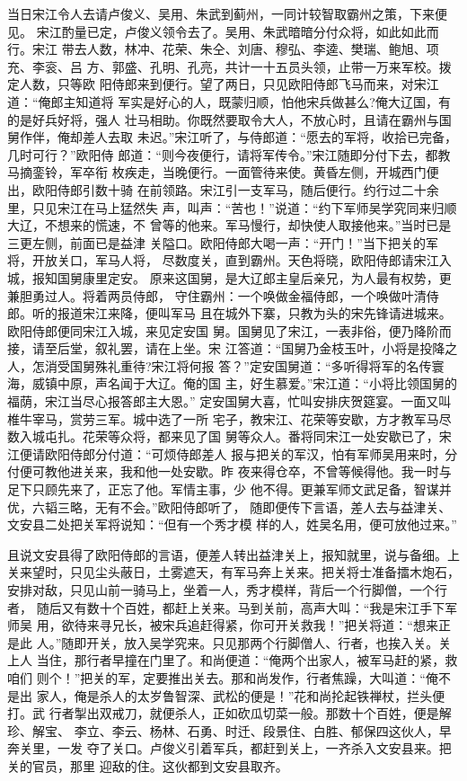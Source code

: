 当日宋江令人去请卢俊义、吴用、朱武到蓟州，一同计较智取霸州之策，下来便见。
宋江酌量已定，卢俊义领令去了。吴用、朱武暗暗分付众将，如此如此而行。宋江
带去人数，林冲、花荣、朱仝、刘唐、穆弘、李逵、樊瑞、鲍旭、项充、李衮、吕
方、郭盛、孔明、孔亮，共计一十五员头领，止带一万来军校。拨定人数，只等欧
阳侍郎来到便行。望了两日，只见欧阳侍郎飞马而来，对宋江道：“俺郎主知道将
军实是好心的人，既蒙归顺，怕他宋兵做甚么?俺大辽国，有的是好兵好将，强人
壮马相助。你既然要取令大人，不放心时，且请在霸州与国舅作伴，俺却差人去取
未迟。”宋江听了，与侍郎道：“愿去的军将，收拾已完备，几时可行？”欧阳侍
郎道：“则今夜便行，请将军传令。”宋江随即分付下去，都教马摘銮铃，军卒衔
枚疾走，当晚便行。一面管待来使。黄昏左侧，开城西门便出，欧阳侍郎引数十骑
在前领路。宋江引一支军马，随后便行。约行过二十余里，只见宋江在马上猛然失
声，叫声：“苦也！”说道：“约下军师吴学究同来归顺大辽，不想来的慌速，不
曾等的他来。军马慢行，却快使人取接他来。”当时已是三更左侧，前面已是益津
关隘口。欧阳侍郎大喝一声：“开门！”当下把关的军将，开放关口，军马人将，
尽数度关，直到霸州。天色将晓，欧阳侍郎请宋江入城，报知国舅康里定安。
原来这国舅，是大辽郎主皇后亲兄，为人最有权势，更兼胆勇过人。将着两员侍郎，
守住霸州：一个唤做金福侍郎，一个唤做叶清侍郎。听的报道宋江来降，便叫军马
且在城外下寨，只教为头的宋先锋请进城来。欧阳侍郎便同宋江入城，来见定安国
舅。国舅见了宋江，一表非俗，便乃降阶而接，请至后堂，叙礼罢，请在上坐。宋
江答道：“国舅乃金枝玉叶，小将是投降之人，怎消受国舅殊礼重待?宋江将何报
答？”定安国舅道：“多听得将军的名传寰海，威镇中原，声名闻于大辽。俺的国
主，好生慕爱。”宋江道：“小将比领国舅的福荫，宋江当尽心报答郎主大恩。”
定安国舅大喜，忙叫安排庆贺筵宴。一面又叫椎牛宰马，赏劳三军。城中选了一所
宅子，教宋江、花荣等安歇，方才教军马尽数入城屯扎。花荣等众将，都来见了国
舅等众人。番将同宋江一处安歇已了，宋江便请欧阳侍郎分付道：“可烦侍郎差人
报与把关的军汉，怕有军师吴用来时，分付便可教他进关来，我和他一处安歇。昨
夜来得仓卒，不曾等候得他。我一时与足下只顾先来了，正忘了他。军情主事，少
他不得。更兼军师文武足备，智谋并优，六韬三略，无有不会。”欧阳侍郎听了，
随即便传下言语，差人去与益津关、文安县二处把关军将说知：“但有一个秀才模
样的人，姓吴名用，便可放他过来。”

且说文安县得了欧阳侍郎的言语，便差人转出益津关上，报知就里，说与备细。上
关来望时，只见尘头蔽日，土雾遮天，有军马奔上关来。把关将士准备擂木炮石，
安排对敌，只见山前一骑马上，坐着一人，秀才模样，背后一个行脚僧，一个行者，
随后又有数十个百姓，都赶上关来。马到关前，高声大叫：“我是宋江手下军师吴
用，欲待来寻兄长，被宋兵追赶得紧，你可开关救我！”把关将道：“想来正是此
人。”随即开关，放入吴学究来。只见那两个行脚僧人、行者，也挨入关。关上人
当住，那行者早撞在门里了。和尚便道：“俺两个出家人，被军马赶的紧，救咱们
则个！”把关的军，定要推出关去。那和尚发作，行者焦躁，大叫道：“俺不是出
家人，俺是杀人的太岁鲁智深、武松的便是！”花和尚抡起铁禅杖，拦头便打。武
行者掣出双戒刀，就便杀人，正如砍瓜切菜一般。那数十个百姓，便是解珍、解宝、
李立、李云、杨林、石勇、时迁、段景住、白胜、郁保四这伙人，早奔关里，一发
夺了关口。卢俊义引着军兵，都赶到关上，一齐杀入文安县来。把关的官员，那里
迎敌的住。这伙都到文安县取齐。

